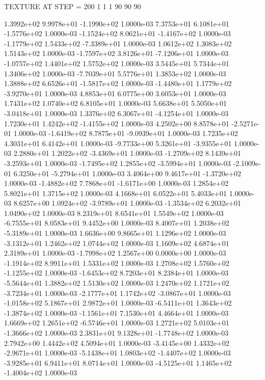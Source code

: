 TEXTURE AT STEP = 200
1 1 1
90 90 90

 1.3992e+02  9.9978e+01 -1.1990e+02  1.0000e-03
 7.3753e+01  6.1081e+01 -1.5776e+02  1.0000e-03
-1.1524e+02  8.0621e+01 -1.4167e+02  1.0000e-03
-1.1779e+02  1.5433e+02 -7.3389e+01  1.0000e-03
1.0612e+02 1.3083e+02 1.5143e+02  1.0000e-03
-1.7597e+02  3.8126e+01 -7.1206e+01  1.0000e-03
-1.0757e+02  1.4401e+02  1.5752e+02  1.0000e-03
3.5445e+01 5.7344e+01 1.3406e+02  1.0000e-03
-7.7039e+01  5.5776e+01  1.3853e+02  1.0000e-03
 1.3888e+02  6.6526e+01 -1.5817e+02  1.0000e-03
-1.4480e+01  1.1779e+02 -3.9270e+01  1.0000e-03
4.8853e+01 6.0775e+00 3.6053e+01  1.0000e-03
1.7431e+02 1.0740e+02 6.8105e+01  1.0000e-03
 5.6638e+01  5.5050e+01 -3.0418e+01  1.0000e-03
 1.3376e+02  6.3067e+01 -4.1254e+01  1.0000e-03
 1.7230e+01  1.4242e+02 -1.4155e+02  1.0000e-03
 4.2502e+00  8.8578e+01 -2.5271e-01  1.0000e-03
-1.6419e+02  8.7875e+01 -9.0939e+01  1.0000e-03
1.7235e+02 4.3031e+01 6.4142e+01  1.0000e-03
-9.7733e+00  5.3261e+01 -3.9355e+01  1.0000e-03
 2.2880e+01  1.2022e+02 -3.4369e+01  1.0000e-03
-1.2709e+02  8.1439e+01 -3.2593e+01  1.0000e-03
-1.7495e+02  1.2855e+02 -3.5994e+01  1.0000e-03
-2.1009e-01  6.3250e+01 -5.2794e+01  1.0000e-03
 3.4064e+00  9.4617e+01 -1.3720e+02  1.0000e-03
-1.4882e+02  7.7868e+01 -1.6171e+00  1.0000e-03
1.2854e+02 5.8021e+01 1.3715e+02  1.0000e-03
4.1668e+01 6.0522e+01 5.4033e+01  1.0000e-03
 8.6257e+00  1.0924e+02 -3.9789e+01  1.0000e-03
-1.3534e+02  6.2032e+01  1.0490e+02  1.0000e-03
8.2319e+01 8.6541e+01 1.5549e+02  1.0000e-03
-6.7555e+01  8.0583e+01  9.4452e+00  1.0000e-03
 8.4007e+01  1.2038e+02 -5.3189e+01  1.0000e-03
1.6636e+00 9.8665e+01 1.1296e+02  1.0000e-03
-3.1312e+01  1.2462e+02  1.0744e+02  1.0000e-03
1.1609e+02 4.6874e+01 2.3189e+01  1.0000e-03
-1.7998e+02  1.2567e+00  0.0000e+00  1.0000e-03
-1.1914e+02  8.9911e+01  1.5331e+02  1.0000e-03
 1.2708e+02  1.5760e+02 -1.1255e+02  1.0000e-03
-1.6453e+02  8.7203e+01  8.2384e+01  1.0000e-03
-5.5644e+01  1.3882e+02  1.5130e+02  1.0000e-03
 1.2470e+02  1.1721e+02 -3.7234e+01  1.0000e-03
-2.1777e+01  1.1742e+02 -3.0867e+01  1.0000e-03
-1.0158e+02  5.1867e+01  2.9872e+01  1.0000e-03
-6.5411e+01  1.3643e+02 -1.3874e+02  1.0000e-03
-1.1561e+01  7.1530e+01  4.4664e+01  1.0000e-03
 1.6669e+02  1.2651e+02 -6.5746e+01  1.0000e-03
 1.2721e+02  5.0103e+01 -1.3666e+02  1.0000e-03
 2.3831e+01  9.1328e+01 -1.7748e+02  1.0000e-03
2.7942e+00 1.4442e+02 4.5094e+01  1.0000e-03
-3.4145e+00  1.4332e+02 -2.9671e+01  1.0000e-03
-5.1438e+01  1.0803e+02 -1.4407e+02  1.0000e-03
-3.9285e+01  6.9411e+01  8.0714e+01  1.0000e-03
-4.5125e+01  1.1465e+02 -1.4004e+02  1.0000e-03
